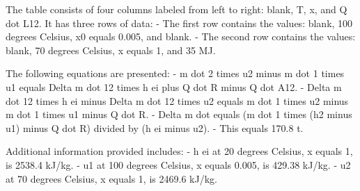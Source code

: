 The table consists of four columns labeled from left to right: blank, T, x, and Q dot L12. It has three rows of data:
- The first row contains the values: blank, 100 degrees Celsius, x0 equals 0.005, and blank.
- The second row contains the values: blank, 70 degrees Celsius, x equals 1, and 35 MJ.

The following equations are presented:
- m dot 2 times u2 minus m dot 1 times u1 equals Delta m dot 12 times h ei plus Q dot R minus Q dot A12.
- Delta m dot 12 times h ei minus Delta m dot 12 times u2 equals m dot 1 times u2 minus m dot 1 times u1 minus Q dot R.
- Delta m dot equals (m dot 1 times (h2 minus u1) minus Q dot R) divided by (h ei minus u2).
- This equals 170.8 t.

Additional information provided includes:
- h ei at 20 degrees Celsius, x equals 1, is 2538.4 kJ/kg.
- u1 at 100 degrees Celsius, x equals 0.005, is 429.38 kJ/kg.
- u2 at 70 degrees Celsius, x equals 1, is 2469.6 kJ/kg.